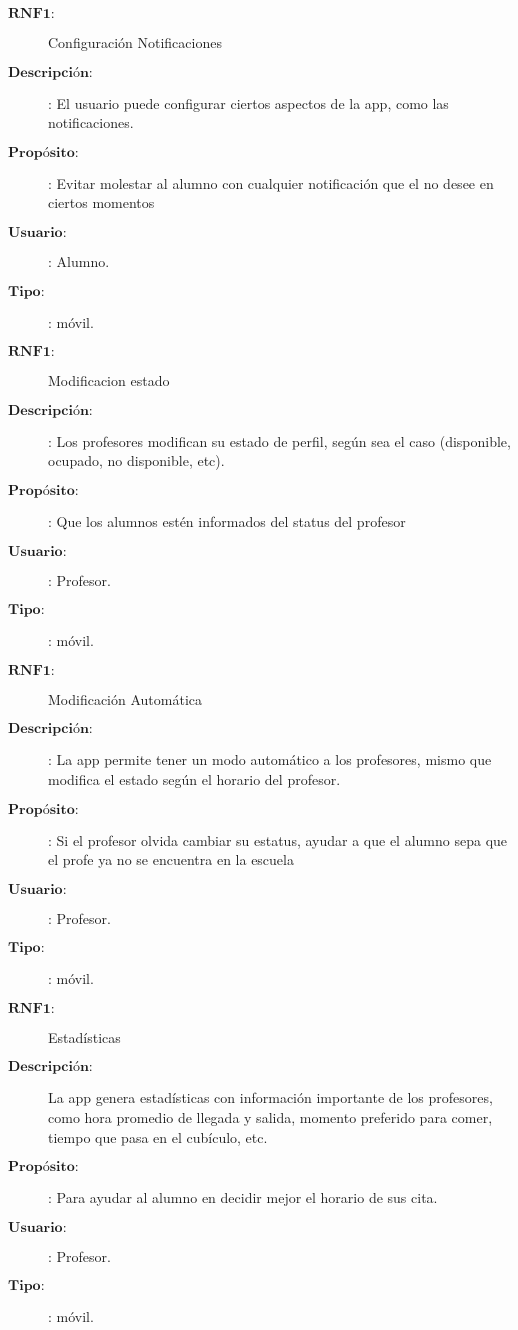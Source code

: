 \begin{description}
\item[$\textbf{RNF1:}$] Configuración Notificaciones  
\item[$\textbf{Descripción:}$]: El usuario puede configurar ciertos aspectos de la app, como las notificaciones. 
\item[$\textbf{Propósito:}$]: Evitar molestar al alumno con cualquier notificación que el no desee en ciertos momentos
\item[$\textbf{Usuario:}$]: Alumno.
\item[$\textbf{Tipo:}$]: móvil. \\

\item[$\textbf{RNF1:}$] Modificacion estado  
\item[$\textbf{Descripción:}$]: Los profesores modifican su estado de perfil, según sea el caso (disponible, ocupado, no disponible, etc).
\item[$\textbf{Propósito:}$]: Que los alumnos estén informados del status del profesor
\item[$\textbf{Usuario:}$]: Profesor.
\item[$\textbf{Tipo:}$]: móvil. \\

\item[$\textbf{RNF1:}$] Modificación Automática  
\item[$\textbf{Descripción:}$]: La app permite tener un modo automático a los profesores, mismo que modifica el estado según el horario del profesor.
\item[$\textbf{Propósito:}$]: Si el profesor olvida cambiar su estatus, ayudar a que el alumno sepa que el profe ya no se encuentra en la escuela
\item[$\textbf{Usuario:}$]: Profesor.
\item[$\textbf{Tipo:}$]: móvil. \\

\item[$\textbf{RNF1:}$] Estadísticas 
\item[$\textbf{Descripción:}$] La app genera estadísticas con información importante de los profesores, como hora promedio de llegada y salida, momento preferido para comer, tiempo que pasa en el cubículo, etc.
\item[$\textbf{Propósito:}$]: Para ayudar al alumno en decidir mejor el horario de sus cita.
\item[$\textbf{Usuario:}$]: Profesor.
\item[$\textbf{Tipo:}$]: móvil. \\


\end{description}
